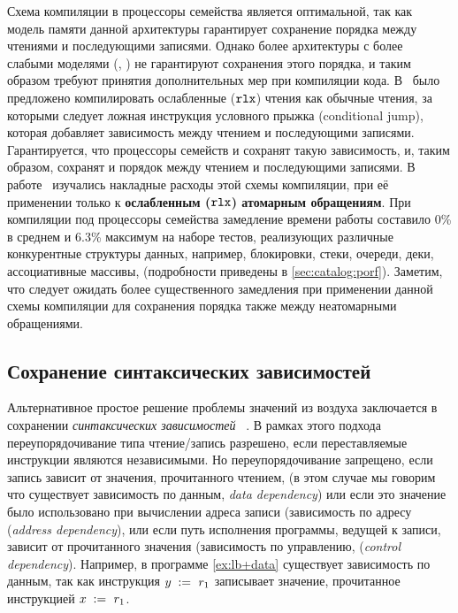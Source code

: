 Схема компиляции в процессоры семейства \Intel
является оптимальной, так как модель памяти данной 
архитектуры гарантирует сохранение порядка 
между чтениями и последующими записями. 
Однако более архитектуры с более слабыми моделями (\ARM, \POWER)
не гарантируют сохранения этого порядка, 
и таким образом требуют принятия дополнительных мер при компиляции кода. 
В~\cite{Boehm-Demsky:MSPC14} было предложено компилировать 
ослабленные ($\mathtt{rlx}$) чтения как обычные чтения, 
за которыми следует ложная инструкция условного прыжка 
(conditional jump), которая добавляет зависимость 
между чтением и последующими записями. 
Гарантируется, что процессоры семейств \ARM и \POWER 
сохранят такую зависимость, и, таким образом, 
сохранят и порядок между чтением и последующими записями. 
В работе~\cite{Ou-Demsky:OOPSLA18} изучались 
накладные расходы этой схемы компиляции, 
при её применении только к \textbf{ослабленным ($\mathtt{rlx}$) атомарным обращениям}.
При компиляции под процессоры семейства  
замедление времени работы составило 0\% в среднем и 6.3\% максимум 
на наборе тестов, реализующих различные конкурентные 
структуры данных, например, блокировки, стеки, очереди, 
деки, ассоциативные массивы, \etc
(подробности приведены в \ref{sec:catalog:porf}).
Заметим, что следует ожидать более существенного замедления
при применении данной схемы компиляции для 
сохранения порядка также между неатомарными обращениями. 

\subsection{Сохранение синтаксических зависимостей}
\label{sec:analysis:deprf}

Альтернативное простое решение проблемы значений из воздуха 
заключается в сохранении \emph{синтаксических зависимостей}~%
\cite{Boehm-Demsky:MSPC14, Alglave-al:ASPLOS18}.
В рамках этого подхода переупорядочивание типа чтение/запись 
разрешено, если переставляемые инструкции являются независимыми. 
Но переупорядочивание запрещено, если запись зависит 
от значения, прочитанного чтением, 
(в этом случае мы говорим что существует зависимость по данным, \emph{data dependency})
или если это значение было использовано при вычислении адреса записи 
(зависимость по адресу (\emph{address dependency}), 
или если путь исполнения программы, ведущей к записи, 
зависит от прочитанного значения 
(зависимость по управлению, (\emph{control dependency}).
Например, в программе \ref{ex:lb+data} 
существует зависимость по данным, так как 
инструкция $y\;:=_{}\;r_1$ записывает 
значение, прочитанное инструкцией $x\;:=_{}\;r_1$. 

